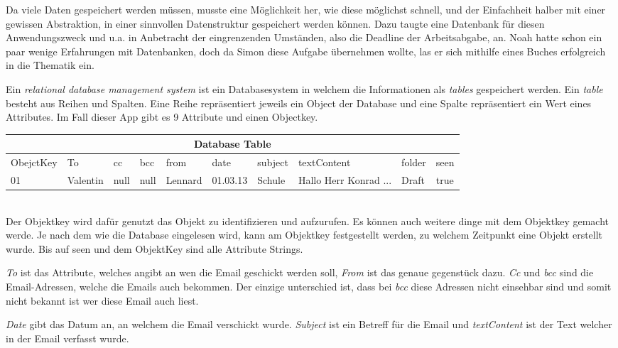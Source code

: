 \documentclass[a4paper,11pt]{article}
\begin{document}
Da viele Daten gespeichert werden müssen, musste eine Möglichkeit her, wie diese möglichst schnell, und der Einfachheit halber mit einer gewissen Abstraktion, in einer sinnvollen Datenstruktur gespeichert werden können. Dazu taugte eine Datenbank für diesen Anwendungszweck und u.a. in Anbetracht der eingrenzenden Umständen, also die Deadline der Arbeitsabgabe, an. Noah hatte schon ein paar wenige Erfahrungen mit Datenbanken, doch da Simon diese Aufgabe übernehmen wollte, las er sich mithilfe eines Buches \cite{riccardi2001} erfolgreich in die Thematik ein.


Ein \textit{relational database management system} ist ein Databasesystem in welchem die Informationen als \textit{tables} gespeichert werden. 
Ein \textit{table} besteht aus Reihen und Spalten. Eine Reihe repräsentiert jeweils ein Object der Database und eine Spalte repräsentiert ein Wert eines Attributes. Im Fall dieser App
gibt es 9 Attribute und einen Objectkey. \\


\begin{tabular}{ |p{1.6cm}  |p{1.1cm} |p{1.1cm} |p{1.05cm} |p{1.15cm} |p{1.15cm} |p{1.25cm} |p{1.75cm} |p{1.25cm} |p{1.15cm}|}
 \hline
 \multicolumn{10}{|c|}{Database Table} \\
 \hline
    ObejctKey &To & cc & bcc & from & date & subject & textContent & folder & seen  \\
 \hline
     01    &Valentin& null & null & Lennard & 01.03.13 & Schule &  Hallo Herr Konrad ...& Draft & true \\
 \hline
\end{tabular} \\

Der Objektkey wird dafür genutzt das Objekt zu identifizieren und aufzurufen. Es können auch weitere dinge mit dem Objektkey gemacht werde. 
Je nach dem wie die Database eingelesen wird, kann am Objektkey festgestellt werden, zu welchem Zeitpunkt eine Objekt erstellt wurde. Bis auf seen und dem ObjektKey sind 
alle Attribute Strings. 

\textit{To} ist das Attribute, welches angibt an wen die Email geschickt werden soll, \textit{From} ist das genaue gegenstück dazu. \textit{Cc} und \textit{bcc} sind die 
Email-Adressen, welche die Emails auch bekommen. Der einzige unterschied ist, dass bei \textit{bcc} diese Adressen nicht einsehbar sind und somit nicht bekannt ist wer diese Email auch liest. 

\textit{Date} gibt das Datum an, an welchem die Email verschickt wurde. \textit{Subject} ist ein Betreff für die Email und \textit{textContent} ist der Text welcher in der Email verfasst wurde. 
\end{document}
